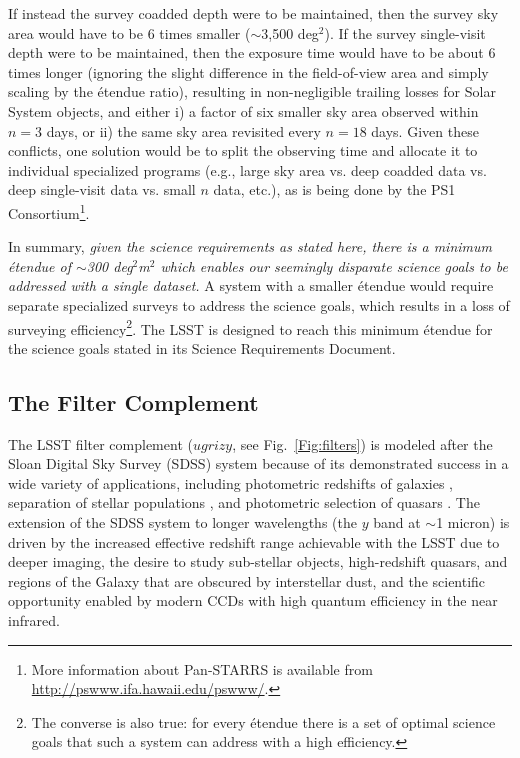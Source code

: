 If instead the survey coadded depth were to be maintained, then the survey sky
area would have to be 6 times smaller ($\sim$3,500 deg$^2$). If the
survey single-visit depth were to be maintained, then the exposure
time would have to be about 6 times longer (ignoring the slight difference
in the field-of-view area and simply scaling by the \'etendue ratio),
resulting in non-negligible trailing losses for Solar System objects,
and either
i) a factor of six smaller sky area observed within $n=3$ days, or
ii) the same sky area revisited every $n=18$ days.
Given these conflicts, one solution would be to split the observing time and
allocate it to individual specialized programs (e.g., large sky area vs.
deep coadded data vs. deep single-visit data vs. small $n$ data, etc.),
as is being done by the PS1 Consortium\footnote{More information about
Pan-STARRS is available from \url{http://pswww.ifa.hawaii.edu/pswww/}.}.

In summary,
\textit{given the science requirements as stated here, there is a
minimum \'etendue of $\sim$300 deg$^2$m$^2$ which enables our seemingly
disparate science goals to be addressed with a single dataset.}
A system with a smaller \'etendue would require separate specialized surveys
to address the science goals, which results in a loss of surveying
efficiency\footnote{The converse is also true: for every \'etendue
there is a set of optimal science goals that such a system can
address with a high efficiency.}. The LSST is designed to reach this
minimum \'etendue for the science goals stated in its Science Requirements
Document.



\subsection{  The Filter Complement }

The LSST filter complement ($ugrizy$, see Fig.~\ref{Fig:filters}) is modeled after the Sloan
Digital Sky Survey
(SDSS) system \citep{1996AJ....111.1748F} because of its demonstrated success in a wide
variety of applications, including photometric redshifts of galaxies \citep{2003ApJ...595...59B},
separation of stellar populations \citep{1998ApJS..119..121L,2003ApJ...586..195H},
and photometric selection of quasars \citep{2002AJ....123.2945R,2012ApJS..199....3R}. The extension of the
SDSS system to longer wavelengths
(the $y$ band at $\sim$1 micron) is driven by the increased effective redshift
range achievable with the LSST due to deeper imaging, the desire to study sub-stellar
objects, high-redshift quasars, and regions of the Galaxy that are obscured by
interstellar dust, and
the scientific opportunity enabled by modern CCDs with high quantum efficiency
in the near infrared.

